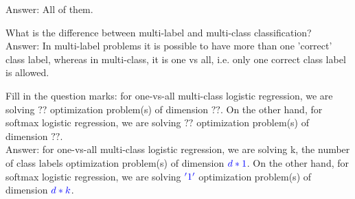 \documentclass{article}
\def\blu#1{{\color{blu}#1}}
\begin{document}
{\blu{Answer: All of them.}
\item What is the difference between multi-label and multi-class classification? \\
\blu{Answer: In multi-label problems it is possible to have more than one 'correct' class label, whereas in multi-class, it is one vs all, i.e. only one correct class label is allowed.}
\item Fill in the question marks: for one-vs-all multi-class logistic regression, we are solving $??$ optimization problem(s) of dimension $??$. On the other hand, for softmax logistic regression, we are solving $??$ optimization problem(s) of dimension $??$. \\
\blu{Answer:} for one-vs-all multi-class logistic regression, we are solving \blu{k, the number of class labels} optimization problem(s) of dimension $\blu{d *1}$. On the other hand, for softmax logistic regression, we are solving $\blu{'1'}$ optimization problem(s) of dimension $\blu{d * k}$.
}
\end{document}

